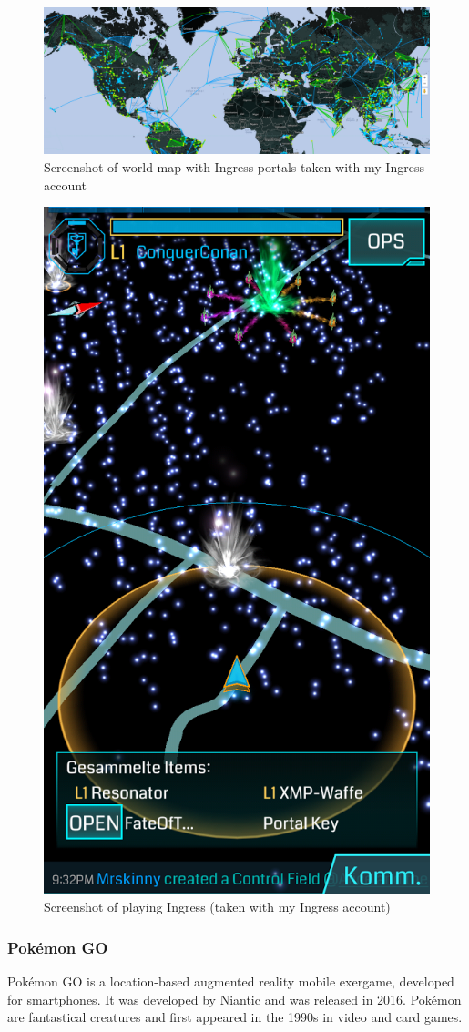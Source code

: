 \begin{figure}[bth]
  \centering
        \includegraphics[width=.95\linewidth]{gfx/ingress_map}
        \caption{Screenshot of world map with Ingress portals taken with my Ingress account}
        \label{fig:ingressMap}
\end{figure}
\begin{figure}[bth]
  \centering
        \includegraphics[width=.45\linewidth]{gfx/ingress_gameplay}
        \caption{Screenshot of playing Ingress (taken with my Ingress account)}
        \label{fig:ingressGameplay}
\end{figure}

\subsubsection{Pok\'{e}mon GO}
Pok\'{e}mon GO is a location-based augmented reality mobile exergame, developed for smartphones. It was developed by Niantic and was released in 2016. Pok\'{e}mon are fantastical creatures and first appeared in the 1990s in video and card games.

